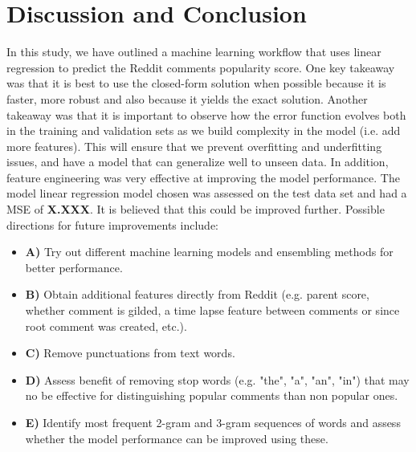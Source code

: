\documentclass[11pt]{article}
\begin{document}
\section{Discussion and Conclusion}
In this study, we have outlined a machine learning workflow that uses linear regression to predict the Reddit comments popularity score. One key takeaway was that it is best to use the closed-form solution when possible because it is faster, more robust and also because it yields the exact solution. Another takeaway was that it is important to observe how the error function evolves both in the training and validation sets as we build complexity in the model (i.e. add more features). This will ensure that we prevent overfitting and underfitting issues, and have a model that can generalize well to unseen data. In addition, feature engineering was very effective at improving the model performance. The model linear regression model chosen was assessed on the test data set and had a MSE of \textbf{X.XXX}. It is believed that this could be improved further. Possible directions for future improvements include: 
\begin{itemize}
    	\item \textbf{A)} Try out different machine learning models and ensembling methods for better performance.
   	\item \textbf{B)} Obtain additional features directly from Reddit (e.g. parent score, whether comment is gilded, a time lapse feature between comments or since root comment was created, etc.).
    	\item \textbf{C)} Remove punctuations from text words.
 	\item \textbf{D)} Assess benefit of removing stop words (e.g. "the", "a", "an", "in") that may no be effective for distinguishing popular comments than non popular ones. 
	\item \textbf{E)} Identify most frequent 2-gram and 3-gram sequences of words and assess whether the model performance can be improved using these.
\end{itemize}
\end{document}

